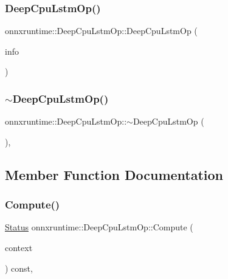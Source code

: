 \subsubsection{\texorpdfstring{Deep\+Cpu\+Lstm\+Op()}{DeepCpuLstmOp()}}
{\footnotesize\ttfamily onnxruntime\+::\+Deep\+Cpu\+Lstm\+Op\+::\+Deep\+Cpu\+Lstm\+Op (\begin{DoxyParamCaption}\item[{const \mbox{\hyperlink{classonnxruntime_1_1OpKernelInfo}{Op\+Kernel\+Info}} \&}]{info }\end{DoxyParamCaption})\hspace{0.3cm}{\ttfamily [inline]}}

\mbox{\label{classonnxruntime_1_1DeepCpuLstmOp_a2253c540870ab432144c98fd3250edec}} 
\subsubsection{\texorpdfstring{$\sim$\+Deep\+Cpu\+Lstm\+Op()}{~DeepCpuLstmOp()}}
{\footnotesize\ttfamily onnxruntime\+::\+Deep\+Cpu\+Lstm\+Op\+::$\sim$\+Deep\+Cpu\+Lstm\+Op (\begin{DoxyParamCaption}{ }\end{DoxyParamCaption})\hspace{0.3cm}{\ttfamily [override]}, {\ttfamily [default]}}



\subsection{Member Function Documentation}
\mbox{\label{classonnxruntime_1_1DeepCpuLstmOp_a65ed186dc993041c05ce342285b5512f}} 
\subsubsection{\texorpdfstring{Compute()}{Compute()}}
{\footnotesize\ttfamily \mbox{\hyperlink{classonnxruntime_1_1common_1_1Status}{Status}} onnxruntime\+::\+Deep\+Cpu\+Lstm\+Op\+::\+Compute (\begin{DoxyParamCaption}\item[{\mbox{\hyperlink{classonnxruntime_1_1OpKernelContext}{Op\+Kernel\+Context}} $\ast$}]{context }\end{DoxyParamCaption}) const\hspace{0.3cm}{\ttfamily [override]}, {\ttfamily [virtual]}}



